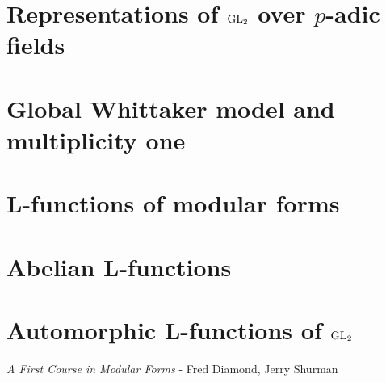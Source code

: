 \documentclass[a4paper,10pt]{article}
\begin{document}
\section{Representations of $\operatorname{GL}_2$ over $p$-adic fields}

\newpage

\section{Global Whittaker model and multiplicity one}

\newpage

\section{L-functions of modular forms}

\newpage

\section{Abelian L-functions}

\newpage

\section{Automorphic L-functions of $\operatorname{GL}_2$}

\newpage




\begin{thebibliography}{}

\textit{A First Course in Modular Forms} - Fred Diamond, Jerry Shurman

\end{thebibliography}

\printindex
\newpage
\end{document}
